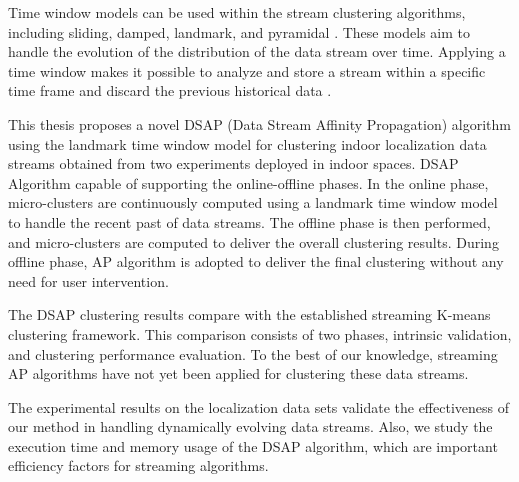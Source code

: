 \documentclass[../UNBThesis2.tex]{subfiles}
\begin{document}
Time window models can be used within the stream clustering algorithms, including sliding, damped, landmark, and pyramidal \cite{nguyen2015survey}. These models aim to handle the evolution of the distribution of the data stream over time. Applying a time window makes it possible to analyze and store a stream within a specific time frame and discard the previous historical data \cite{mansalis2018evaluation}.

This thesis proposes a novel DSAP (Data Stream Affinity Propagation) algorithm using the landmark time window model for clustering indoor localization data streams obtained from two experiments deployed in indoor spaces. DSAP Algorithm capable of supporting the online-offline phases. In the online phase, micro-clusters are continuously computed using a landmark time window model to handle the recent past of data streams. The offline phase is then performed, and micro-clusters are computed to deliver the overall clustering results. During offline phase, AP algorithm is adopted to deliver the final clustering without any need for user intervention.

The DSAP clustering results compare with the established streaming K-means clustering framework. This comparison consists of two phases, intrinsic validation, and clustering performance evaluation.
To the best of our knowledge, streaming AP algorithms have not yet been applied for clustering these data streams. 

The experimental results on the localization data sets validate the effectiveness of our method in handling
dynamically evolving data streams. Also, we study the execution time and memory usage of the DSAP algorithm, which are important efficiency factors for streaming algorithms.










\end{document}
